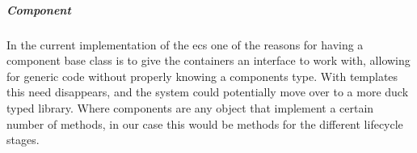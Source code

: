 \subparagraph{Component}
In the current implementation of the ecs one of the reasons for having a component
base class is to give the containers an interface to work with, allowing for
generic code without properly knowing a components type.
With templates this need disappears, and the system could potentially move
over to a more duck typed library.
Where components are any object that implement a certain number of methods,
in our case this would be methods for the different lifecycle stages.
